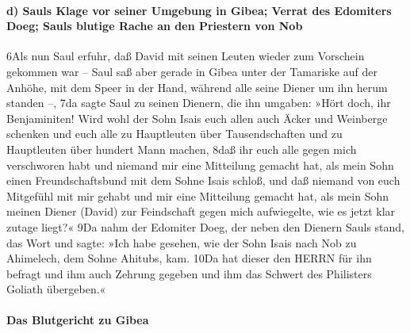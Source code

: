 \hypertarget{d-sauls-klage-vor-seiner-umgebung-in-gibea-verrat-des-edomiters-doeg-sauls-blutige-rache-an-den-priestern-von-nob}{%
\paragraph{d) Sauls Klage vor seiner Umgebung in Gibea; Verrat des
Edomiters Doeg; Sauls blutige Rache an den Priestern von
Nob}\label{d-sauls-klage-vor-seiner-umgebung-in-gibea-verrat-des-edomiters-doeg-sauls-blutige-rache-an-den-priestern-von-nob}}

6Als nun Saul erfuhr, daß David mit seinen Leuten wieder zum Vorschein
gekommen war -- Saul saß aber gerade in Gibea unter der Tamariske auf
der Anhöhe, mit dem Speer in der Hand, während alle seine Diener um ihn
herum standen --, 7da sagte Saul zu seinen Dienern, die ihn umgaben:
»Hört doch, ihr Benjaminiten! Wird wohl der Sohn Isais euch allen auch
Äcker und Weinberge schenken und euch alle zu Hauptleuten über
Tausendschaften und zu Hauptleuten über hundert Mann machen, 8daß ihr
euch alle gegen mich verschworen habt und niemand mir eine Mitteilung
gemacht hat, als mein Sohn einen Freundschaftsbund mit dem Sohne Isais
schloß, und daß niemand von euch Mitgefühl mit mir gehabt und mir eine
Mitteilung gemacht hat, als mein Sohn meinen Diener (David) zur
Feindschaft gegen mich aufwiegelte, wie es jetzt klar zutage liegt?« 9Da
nahm der Edomiter Doeg, der neben den Dienern Sauls stand, das Wort und
sagte: »Ich habe gesehen, wie der Sohn Isais nach Nob zu Ahimelech, dem
Sohne Ahitubs, kam. 10Da hat dieser den HERRN für ihn befragt und ihm
auch Zehrung gegeben und ihm das Schwert des Philisters Goliath
übergeben.«

\hypertarget{das-blutgericht-zu-gibea}{%
\paragraph{Das Blutgericht zu Gibea}\label{das-blutgericht-zu-gibea}}


